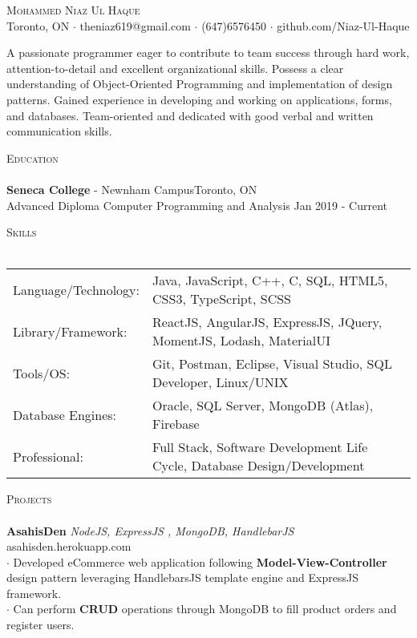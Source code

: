 \documentclass[a4paper]{article}
\newcommand{\lineunder} {
    \vspace*{-8pt} \\
    \hspace*{-18pt} \hrulefill \\
}
\newcommand{\header} [1] {
    {\hspace*{-18pt}\vspace*{6pt} \textsc{#1}}
    \vspace*{-6pt} \lineunder
}
\begin{document}
\vspace*{-40pt}

    

\vspace*{-10pt}
\begin{center}
	{\Huge \scshape {Mohammed Niaz Ul Haque}}\\
	Toronto, ON $\cdot$ theniaz619@gmail.com $\cdot$ (647)6576450 $\cdot$ github.com/Niaz-Ul-Haque\\
\end{center}

\text A passionate programmer eager to contribute to team success through hard work, attention-to-detail and excellent organizational skills. Possess a clear understanding of Object-Oriented Programming and implementation of design patterns. Gained experience in developing and working on applications, forms, and databases. Team-oriented and dedicated with good verbal and written communication skills.\\
\vspace{2mm}
\header{Education}
\textbf{Seneca College} - Newnham Campus\hfill Toronto, ON\\
{Advanced Diploma} Computer Programming and Analysis \hfill Jan 2019 - Current\\
\vspace{2mm}
\header{Skills}\vspace{1mm}
\begin{tabular}{ l l  }
	Language/Technology: & Java, JavaScript, C++, C, SQL, HTML5, CSS3, TypeScript, SCSS  \\
	Library/Framework:   & ReactJS, AngularJS, ExpressJS, JQuery, MomentJS, Lodash, MaterialUI \\
	Tools/OS:               & Git, Postman, Eclipse, Visual Studio, SQL Developer, Linux/UNIX  \\
	Database Engines:      & Oracle, SQL Server, MongoDB (Atlas), Firebase                            \\
	Professional:      & Full Stack, Software Development Life Cycle, Database Design/Development 
                            \\
\end{tabular}
\vspace{0.3mm}

\header{Projects}\vspace{0.3mm}
{\textbf{AsahisDen}} {\sl NodeJS, ExpressJS , MongoDB, HandlebarJS} \hfill asahisden.herokuapp.com\\
$\cdot$ Developed eCommerce web application following {\textbf{Model-View-Controller}} design pattern leveraging HandlebarsJS template engine and ExpressJS framework.\\
$\cdot$ Can perform {\textbf{CRUD}} operations through MongoDB to fill product orders and register users.\\
\vspace*{2mm}
\end{document}
